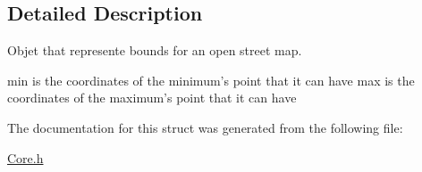 \subsection{Detailed Description}
Objet that represente bounds for an open street map. 

min is the coordinates of the minimum's point that it can have max is the coordinates of the maximum's point that it can have 

The documentation for this struct was generated from the following file\-:\begin{DoxyCompactItemize}
\item 
\hyperlink{Core_8h}{Core.\-h}\end{DoxyCompactItemize}
